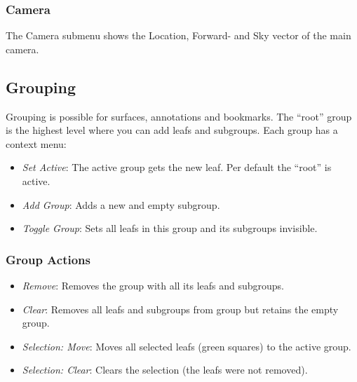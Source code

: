 \subsubsection{Camera} 

The Camera submenu shows the Location, Forward- and Sky vector of the main camera.
\subsection{Grouping}
\label{sec:grouping}


Grouping is possible for surfaces, annotations and bookmarks.
The ``root'' group is the highest level where you can add leafs and subgroups.
Each group has a context menu:
\begin{itemize}
	\item \textit{Set Active}: The active group gets the new leaf. Per default the ``root'' is active.
	\item \textit{Add Group}: Adds a new and empty subgroup.
	\item \textit{Toggle Group}: Sets all leafs in this group and its subgroups invisible.
\end{itemize}

\subsubsection{Group Actions}
\label{sec:groupActions}

\begin{itemize}
	\item \textit{Remove}: Removes the group with all its leafs and subgroups.
	\item \textit{Clear}: Removes all leafs and subgroups from group but retains the empty group. 
	\item \textit{Selection: Move}: Moves all selected leafs (green squares) to the active group.
	\item \textit{Selection: Clear}: Clears the selection (the leafs were not removed).
\end{itemize}
	
